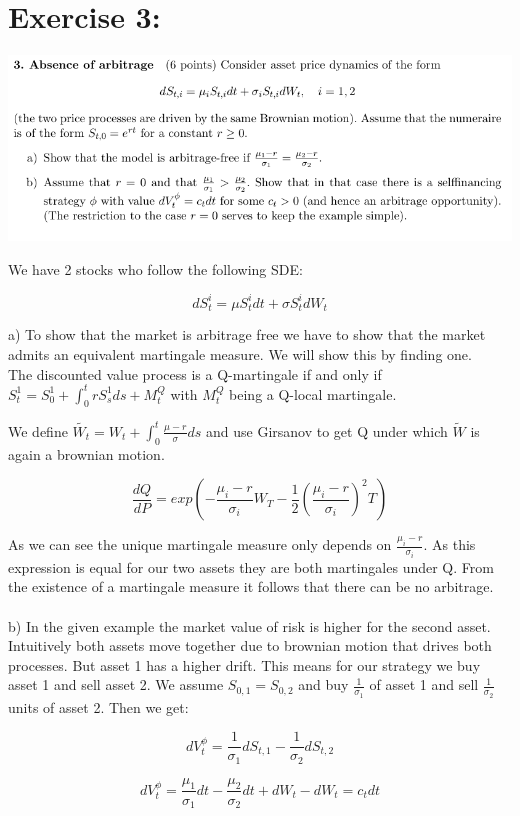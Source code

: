 \documentclass[document.tex]{subfiles}
\begin{document}
\section*{Exercise 3:}

\includegraphics[width=\textwidth]{ex3.png}


We have 2 stocks who follow the following SDE:

\begin{equation}
d S^i_t = \mu S^i_t dt + \sigma S^i_t d W_t
\end{equation}

a) To show that the market is arbitrage free we have to show that the market admits an equivalent martingale measure. We will show this by finding one. \\

The discounted value process is a Q-martingale if and only if $S^1_t = S^1_0 + \int_0^t rS^1_s ds + M^Q_t$ with $M^Q_t$ being a Q-local martingale.

We define $\tilde{W_t} = W_t + \int_0^t  \frac{\mu - r}{\sigma} ds$ and use Girsanov to get Q under which $\tilde{W}$ is again a brownian motion.

\begin{equation}
\frac{d Q}{d P} = exp(-\frac{\mu_i - r}{\sigma_i} W_T - \frac{1}{2} (\frac{\mu_i - r}{\sigma_i})^2 T)
\end{equation}

As we can see the unique martingale measure only depends on $\frac{\mu_i - r}{\sigma_i}$. As this expression is equal for our two assets they are both martingales under Q. From the existence of a martingale measure it follows that there can be no arbitrage. \\ \\

b) In the given example the market value of risk is higher for the second asset. Intuitively both assets move together due to brownian motion that drives both processes. But asset 1 has a higher drift. This means for our strategy we buy asset 1 and sell asset 2. We assume $S_{0, 1} = S_{0, 2}$ and buy $\frac{1}{\sigma_1}$ of asset 1 and sell $\frac{1}{\sigma_2}$ units of asset 2. Then we get:

\begin{equation}
d V_t^{\phi} = \frac{1}{\sigma_1} d S_{t, 1} - \frac{1}{\sigma_2} d S_{t, 2}
\end{equation}

\begin{equation}
d V_t^{\phi} = \frac{\mu_1}{\sigma_1} dt - \frac{\mu_2}{\sigma_2} dt + d W_t - d W_t = c_t dt
\end{equation}
\end{document}
